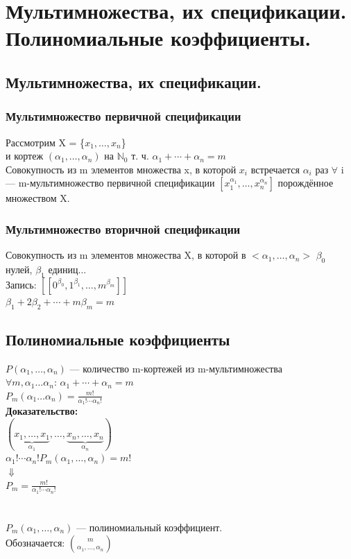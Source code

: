 \documentclass[12pt]{article}
\begin{document}
\section{Мультимножества, их спецификации. Полиномиальные коэффициенты.}
\subsection{Мультимножества, их спецификации.}
\subsubsection{Мультимножество первичной спецификации}
	Рассмотрим X = \{$x_1,\dotsc,x_n$\}\\
	и кортеж $(\alpha_1,\dotsc,\alpha_n)$ на $\mathbb N_0$ т. ч. $\alpha_1+\dotsb+\alpha_n = m$\\
	Совокупность из m элементов множества x, в которой $x_i$ встречается $\alpha_i$ раз $\forall$ i — m-мультимножество первичной спецификации
	$[x_1^{\alpha_1},\dotsc,x_n^{\alpha_n}]$ порождённое множеством X.
\subsubsection{Мультимножество вторичной спецификации}
	Совокупность из m элементов множества X, в которой в $<\alpha_1,\dotsc,\alpha_n>$ $\beta_0$ нулей, $\beta_1$ единиц$\dotsc$\\
	Запись: $[[0^{\beta_0},1^{\beta_1},\dotsc,m^{\beta_m}]]$\\
	$\beta_1 + 2\beta_2 + \dotsb + m\beta_m = m$\\
	
\subsection{Полиномиальные коэффициенты}
	$P(\alpha_1,\dotsc,\alpha_n)$ — количество m-кортежей из m-мультимножества\\
	$\forall m, \alpha_1\dotsc\alpha_n$: $\alpha_1+\dotsb+\alpha_n = m$\\
	$P_m(\alpha_1\dotsc\alpha_n) = \frac{m!}{\alpha_1!\dotsm\alpha_n!}$\\
	\textbf{Доказательство:}\\
	$(\underbrace{x_1,\dotsc,x_1}_{\alpha_1},\dotsc,\underbrace{x_n,\dotsc,x_n}_{\alpha_n})$\\
	$\alpha_1!\dotsm\alpha_n!P_m(\alpha_1,\dotsc,\alpha_n) = m!$\\
	$\Downarrow$\\
	$P_m = \frac{m!}{\alpha_1!\dotsm\alpha_n!}$\\
	\qedsymbol\\
	\\
	$P_m(\alpha_1,\dotsc,\alpha_n)$ — полиномиальный коэффициент.\\
	Обозначается: $\binom{m}{\alpha_1,\dotsc,\alpha_n}$\\
\end{document}
